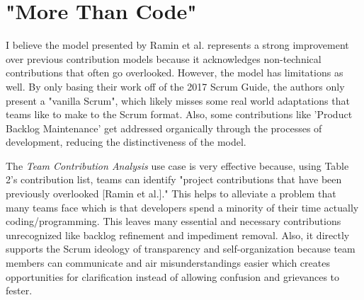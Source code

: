 \documentclass[12pt]{article}
\begin{document}
\section{"More Than Code"}

I believe the model presented by Ramin et al. represents a strong improvement over previous contribution models because it acknowledges
non-technical contributions that often go overlooked. However, the model has limitations as well. By only basing their work off of the 2017 Scrum Guide,
the authors only present a "vanilla Scrum", which likely misses some real world adaptations that teams like to make to the Scrum format. Also,
some contributions like 'Product Backlog Maintenance' get addressed organically through the processes of development, reducing the distinctiveness of the model. 

The \textit{Team Contribution Analysis} use case is very effective because, using Table 2's contribution list, teams can identify "project
contributions that have been previously overlooked [Ramin et al.]." This helps to alleviate a problem that many teams face which is that developers spend a minority
of their time actually coding/programming. This leaves many essential and necessary contributions unrecognized like backlog refinement and impediment removal.
Also, it directly supports the Scrum ideology of transparency and self-organization because team members can communicate and air misunderstandings
easier which creates opportunities for clarification instead of allowing confusion and grievances to fester.
\end{document}
